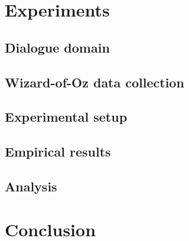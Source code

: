 

\section{Experiments}
\label{sec:wozlearning-experiments}

\subsection{Dialogue domain}
\label{sec:wozlearning-experiments-domain}

\subsection{Wizard-of-Oz data collection}
\label{sec:wozlearning-experiments-woz}

\subsection{Experimental setup}
\label{sec:wozlearning-experiments-setup}

\subsection{Empirical results}
\label{sec:wozlearning-experiments-results}

\subsection{Analysis}
\label{sec:wozlearning-experiments-analysis}

\section{Conclusion}
\label{sec:woz-conclusions}
